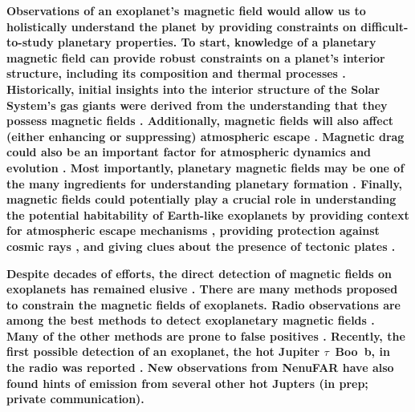  \textbf{Observations of an exoplanet's magnetic field would allow us to holistically understand the planet by providing constraints on difficult-to-study planetary properties. To start, knowledge of a planetary magnetic field can provide robust constraints on a planet's interior structure, including its composition and thermal processes \citep{G2015,Lazio2019,Brain2024}. Historically, initial insights into the interior structure of the Solar System's gas giants were derived from the understanding that they possess magnetic fields \citep{Hubbard1973}. Additionally, magnetic fields will also affect (either enhancing or suppressing) atmospheric escape \citep{G2015,Zarka2018haex,Egan2019,Brain2024}. Magnetic drag could also be an important factor for atmospheric dynamics and evolution \citep{Perna2010a,Beltz2023}. Most importantly, planetary magnetic fields may be one of the many ingredients for understanding planetary formation \citep{Lovelace2008,Batygin2018,Jia2023}. Finally, magnetic fields could potentially play a crucial role in understanding the potential habitability of Earth-like exoplanets by providing context for atmospheric escape mechanisms \citep{Lazio2019,Zarka2018haex}, providing protection against cosmic rays \citep{Gr2015}, and giving clues about the presence of tectonic plates \citep{Shahar2019}. }

\textbf{Despite decades of efforts, the direct detection of magnetic fields on exoplanets has remained elusive \citep{G2015,Brain2024}. There are many methods proposed to constrain the magnetic fields of exoplanets. Radio observations are among the best methods to detect exoplanetary magnetic fields \citep{Zarka2007,Zarka2015SKA,G2015,Brain2024}. Many of the other methods are prone to false positives \citep{G2015,Turner2016a,Route2019}. Recently, the first possible detection of an exoplanet, the hot Jupiter $\tau$~Boo~b, in the radio was reported \citep{Turner2021}. New observations from NenuFAR have also found hints of emission from several other hot Jupters (in prep; private communication).}

